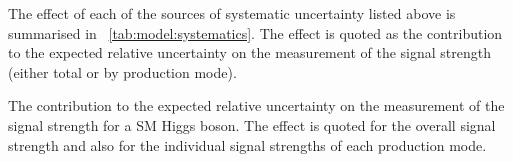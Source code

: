 The effect of each of the sources of systematic uncertainty listed above is summarised in \Table~\ref{tab:model:systematics}. The effect is quoted as the contribution to the expected relative uncertainty on the measurement of the signal strength (either total or by production mode). 

 \begin{table}
  \resizebox{\textwidth}{!}{

}
 \caption{ The contribution to the expected relative uncertainty on the measurement of the signal strength for a SM Higgs boson. The effect is quoted for the overall signal strength and also for the individual signal strengths of each production mode.}
 \label{tab:model:systematics}
\end{table}

